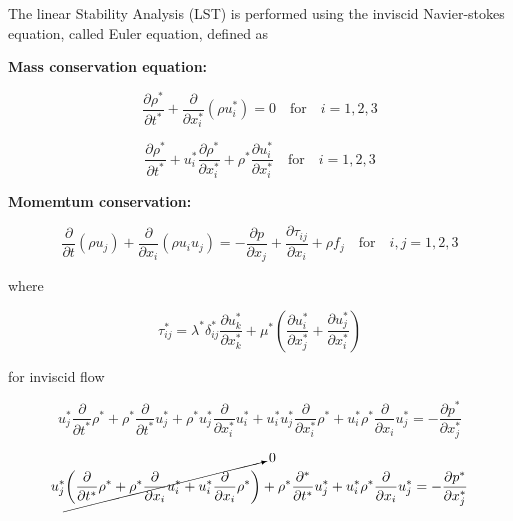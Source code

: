 The linear Stability Analysis (LST) is performed using the  inviscid Navier-stokes equation, called Euler equation, defined as  

\textbf{ Mass conservation  equation:}

\begin{equation} 
\frac{\partial\rho^*}{\partial t^*}+
\frac{\partial}{\partial x_i^*}(\rho u_i^*)=0
\quad \text{for} \quad i=1,2,3
\label{mass}
\end{equation} 

\begin{equation} 
\frac{\partial\rho^*}{\partial t^*}
+
u_i^*
\frac{\partial \rho^*}{\partial x_i^*} 
+
\rho^*
\frac{\partial u_i^*}{\partial x_i^*}
\quad \text{for} \quad i=1,2,3
\label{mass}
\end{equation} 

\textbf{Momemtum conservation:}

\begin{equation} 
\frac{\partial}{\partial t}(\rho u_j)
+
\frac{\partial}{\partial x_i}(\rho u_iu_j)
=
-
\frac{\partial p}{\partial x_j} 
+
\frac{\partial \tau_{ij}}{\partial x_i}
+
\rho f_j
\quad \text{for} \quad i,j=1,2,3
\end{equation} 

where 

\begin{equation} 
\tau_{ij}^*=\lambda^* \delta_{ij}^*\frac{\partial u_k^*}{\partial x_k^*}+
\mu^*\left(\frac{\partial u_i^*}{\partial x_j^*}+\frac{\partial u_j^*}{\partial x_i^*}\right)
\end{equation} 

for inviscid flow 

\begin{equation*} 
u_j^*
\frac{\partial}{\partial t^*}\rho^*
+
\rho^*
\frac{\partial}{\partial t^*}u_j^*
+
\rho^* u_j^*
\frac{\partial}{\partial x_i^*}u_i^*
+
u_i^* u_j^*
\frac{\partial}{\partial x_i^*}\rho^*
+
u_i^* \rho^*
\frac{\partial}{\partial x_i} u_j^*
=
-
\frac{\partial p^*}{\partial x_j^*} 
\end{equation*} 

\begin{equation*} 
u_j^*
\cancelto{0}
{
\left(
    \frac{\partial}{\partial t^*}\rho^*
    +
    \rho^* 
    \frac{\partial}{\partial x_i}u_i^*
    +
    u_i^*
    \frac{\partial}{\partial x_i}\rho^* 
\right)
}
+
\rho^*
\frac{\partial^*}{\partial t^*}u_j^*
+
u_i^* \rho^*
\frac{\partial}{\partial x_i}u_j^*
=
-
\frac{\partial p^*}{\partial x_j^*} 
\end{equation*} 

